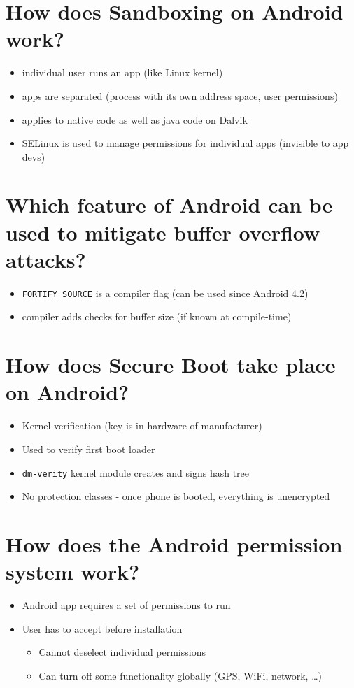 \documentclass[twocolumn]{article}
\newcommand{\question}[1]{\section{#1}}
\begin{document}
\question{How does Sandboxing on Android work?}
%
\begin{itemize}
  \item individual user runs an app (like Linux kernel)
  \item apps are separated (process with its own address space, user permissions)
  \item applies to native code as well as java code on Dalvik
  \item SELinux is used to manage permissions for individual apps (invisible to app devs)
\end{itemize}

\question{Which feature of Android can be used to mitigate buffer overflow attacks?}
%
\begin{itemize}
  \item \texttt{FORTIFY\_SOURCE} is a compiler flag (can be used since Android 4.2)
  \item compiler adds checks for buffer size (if known at compile-time)
\end{itemize}

\question{How does Secure Boot take place on Android?}
%
\begin{itemize}
  \item Kernel verification (key is in hardware of manufacturer)
  \item Used to verify first boot loader
  \item \texttt{dm-verity} kernel module creates and signs hash tree
  \item No protection classes - once phone is booted, everything is unencrypted
\end{itemize}

\question{How does the Android permission system work?}
%
\begin{itemize}
  \item Android app requires a set of permissions to run
  \item User has to accept before installation
    \begin{itemize}
      \item Cannot deselect individual permissions
      \item Can turn off some functionality globally (GPS, WiFi, network, \dots)
    \end{itemize}
\end{itemize}
\end{document}
